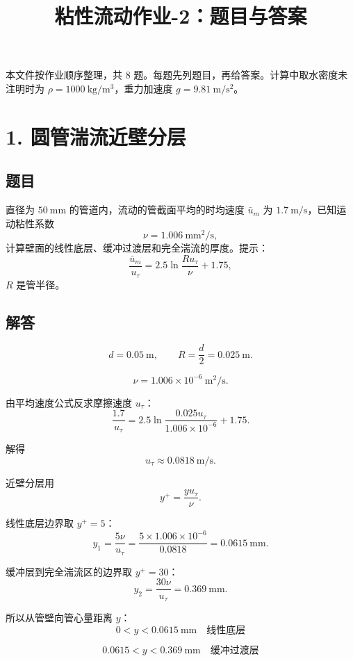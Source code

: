\documentclass[11pt,a4paper]{ctexart}
\title{\vspace{-1.3em}粘性流动作业-2：题目与答案}
\author{}
\date{}
\begin{document}
\maketitle
\vspace{-2.2em}

\begin{tcolorbox}[colback=blue!3,colframe=blue!50!black,title=说明]
本文件按作业顺序整理，共 8 题。每题先列题目，再给答案。计算中取水密度未注明时为
\(\rho=1000\ \mathrm{kg/m^3}\)，重力加速度 \(g=9.81\ \mathrm{m/s^2}\)。
\end{tcolorbox}

\section*{1. 圆管湍流近壁分层}

\subsection*{题目}

直径为 \(50\ \mathrm{mm}\) 的管道内，流动的管截面平均的时均速度
\(\bar u_m\) 为 \(1.7\ \mathrm{m/s}\)，已知运动粘性系数
\[
\nu=1.006\ \mathrm{mm^2/s},
\]
计算壁面的线性底层、缓冲过渡层和完全湍流的厚度。提示：
\[
\frac{\bar u_m}{u_\tau}=2.5\ln\frac{Ru_\tau}{\nu}+1.75,
\]
\(R\) 是管半径。

\subsection*{解答}

\[
d=0.05\ \mathrm{m},\qquad R=\frac d2=0.025\ \mathrm{m}.
\]

\[
\nu=1.006\times10^{-6}\ \mathrm{m^2/s}.
\]

由平均速度公式反求摩擦速度 \(u_\tau\)：
\[
\frac{1.7}{u_\tau}
=2.5\ln\frac{0.025u_\tau}{1.006\times10^{-6}}+1.75.
\]

解得
\[
u_\tau\approx0.0818\ \mathrm{m/s}.
\]

近壁分层用
\[
y^+=\frac{yu_\tau}{\nu}.
\]

线性底层边界取 \(y^+=5\)：
\[
y_1=\frac{5\nu}{u_\tau}
=\frac{5\times1.006\times10^{-6}}{0.0818}
=0.0615\ \mathrm{mm}.
\]

缓冲层到完全湍流区的边界取 \(y^+=30\)：
\[
y_2=\frac{30\nu}{u_\tau}
=0.369\ \mathrm{mm}.
\]

所以从管壁向管心量距离 \(y\)：
\[
\boxed{0<y<0.0615\ \mathrm{mm}\quad\text{线性底层}}
\]

\[
\boxed{0.0615<y<0.369\ \mathrm{mm}\quad\text{缓冲过渡层}}
\]
\end{document}
